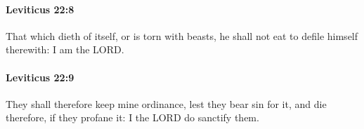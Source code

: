 		\paragraph{Leviticus 22:8} %
			\label{LEVITICUS-22-8}

			That which dieth of itself, or is torn with beasts, he shall not eat to defile himself therewith: I am the LORD.


		\paragraph{Leviticus 22:9} %
			\label{LEVITICUS-22-9}

			They shall therefore keep mine ordinance, lest they bear sin for it, and die therefore, if they profane it: I the LORD do sanctify them.


